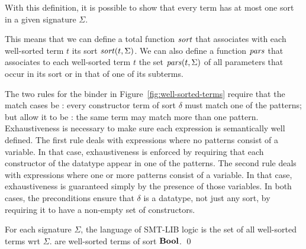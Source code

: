 With this definition, it is possible to show that every  term has 
at most one sort in a given signature $\Sigma$.
\begin{newver}
This means that we can define a total function $\mathit{sort}$ that associates 
with each well-sorted term $t$ its sort $\mathit{sort}(t, \Sigma)$.
We can also define a function $\mathit{pars}$ that associates to each well-sorted term $t$
the set $\mathit{pars}(t, \Sigma)$ of all parameters that occur in its sort or in that 
of one of its subterms.
\end{newver}

\begin{remark}
The two rules for the  binder in Figure~\ref{fig:well-sorted-terms} 
require that the match cases be :
every constructor term of sort $\delta$ must match one of the patterns;
but allow it to be :
the same term may match more than one pattern.
Exhaustiveness is necessary to make sure each  expression is
semantically well defined.
The first rule deals with  expressions where no patterns consist 
of a variable.
In that case, exhaustiveness is enforced by requiring that each constructor
of the datatype appear in one of the patterns.
The second rule deals with  expressions where one or more patterns 
consist of a variable.
In that case, exhaustiveness is guaranteed simply by the presence 
of those variables.
In both cases, the preconditions ensure that $\delta$ is a datatype, 
not just any sort, by requiring it to have a non-empty set of constructors.
\end{remark}

\begin{definition}
For each signature $\Sigma$,
the language of SMT-LIB logic is the set of all well-sorted terms
wrt $\Sigma$.
 are well-sorted terms of sort $\textbf{Bool}$.
\qed
\end{definition}


